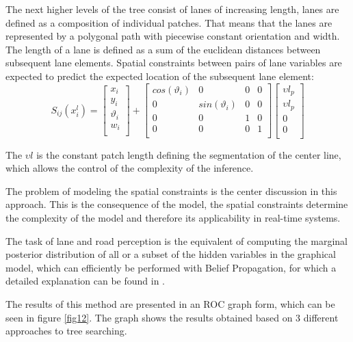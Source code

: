 \documentclass[conference]{IEEEtran}
\begin{document}
The next higher levels of the tree consist of lanes of increasing length, lanes are defined as a composition of individual patches. That means that the lanes are represented by a polygonal path with piecewise constant orientation and width. The length of a lane is defined as a sum of the euclidean distances between subsequent lane elements. Spatial constraints between pairs of lane variables are expected to predict the expected location of the subsequent lane element:
\begin{equation}
S_{ij}(x_i^l) = \begin{bmatrix}
x_i \\
y_i \\
\vartheta_i \\
w_i \\
\end{bmatrix} +
\begin{bmatrix}
cos(\vartheta_i) & 0 & 0 & 0 \\
0 & sin(\vartheta_i) & 0 & 0 \\
0 & 0 & 1 & 0\\
0 & 0 & 0 & 1 \\
\end{bmatrix}
\begin{bmatrix}
\upsilon l_p \\
\upsilon l_p \\
0 \\
0 \\
\end{bmatrix}
\end{equation}

The $\upsilon l $ is the constant patch length defining the segmentation of the center line, which allows the control of the complexity of the inference. 

The problem of modeling the spatial constraints is the center discussion in this approach. This is the consequence of the model, the spatial constraints determine the complexity of the model and therefore its applicability in real-time systems. 

The task of lane and road perception is the equivalent of computing the marginal posterior distribution of all or a subset of the hidden variables in the graphical model, which can efficiently be performed with Belief Propagation, for which a detailed explanation can be found in \cite{lanesystem}.

The results of this method are presented in an ROC graph form, which can be seen in figure \ref{fig12}. The graph shows the results obtained based on 3 different approaches to tree searching.
\end{document}
